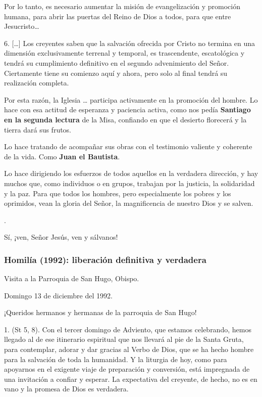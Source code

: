 Por lo tanto, es necesario aumentar la misión de evangelización y promoción humana, para abrir las puertas del Reino de Dios a todos, para que entre Jesucristo\ldots{}

6. {[}\ldots{}{]} Los creyentes saben que la salvación ofrecida por Cristo no termina en una dimensión exclusivamente terrenal y temporal, es trascendente, escatológica y tendrá su cumplimiento definitivo en el segundo advenimiento del Señor. Ciertamente tiene su comienzo aquí y ahora, pero solo al final tendrá su realización completa.

Por esta razón, la Iglesia \ldots{} participa activamente en la promoción del hombre. Lo hace con esa actitud de esperanza y paciencia activa, como nos pedía \textbf{Santiago en la segunda lectura} de la Misa, confiando en que el desierto florecerá y la tierra dará sus frutos.

Lo hace tratando de acompañar sus obras con el testimonio valiente y coherente de la vida. Como \textbf{Juan el Bautista}.

Lo hace dirigiendo los esfuerzos de todos aquellos en la verdadera dirección, y hay muchos que, como individuos o en grupos, trabajan por la justicia, la solidaridad y la paz. Para que todos los hombres, pero especialmente los pobres y los oprimidos, vean la gloria del Señor, la magnificencia de nuestro Dios y se salven.

.

Sí, ¡ven, Señor Jesús, ven y sálvanos!

\subsubsection{Homilía (1992): liberación definitiva y verdadera}

Visita a la Parroquia de San Hugo, Obispo.

Domingo 13 de diciembre del 1992.

¡Queridos hermanos y hermanas de la parroquia de San Hugo!

1.  (St 5, 8). Con el tercer domingo de Adviento, que estamos celebrando, hemos llegado al  de ese itinerario espiritual que nos llevará al pie de la Santa Gruta, para contemplar, adorar y dar gracias al Verbo de Dios, que se ha hecho hombre para la salvación de toda la humanidad. Y la liturgia de hoy, como para apoyarnos en el exigente viaje de preparación y conversión, está impregnada de una invitación a confiar y esperar. La expectativa del creyente, de hecho, no es en vano y la promesa de Dios es verdadera.

